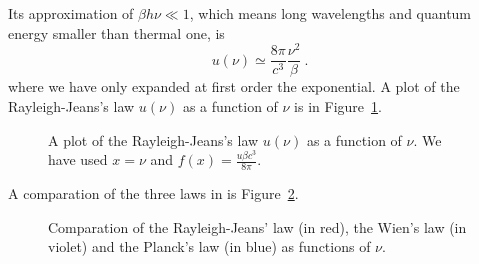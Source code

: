     Its approximation of $\beta h \nu \ll 1$, which means long wavelengths and quantum energy smaller than thermal one, is 
    \begin{equation}
        u(\nu) \simeq \frac{8 \pi}{c^3} \frac{\nu^2}{\beta} ~.
    \end{equation}
    where we have only expanded at first order the exponential. A plot of the Rayleigh-Jeans's law $u(\nu)$ as a function of $\nu$ is in Figure~\ref{br:rj}.
    \begin{figure}
        \centering
        \caption{A plot of the Rayleigh-Jeans's law $u(\nu)$ as a function of $\nu$. We have used $x = \nu$ and $f(x) = \frac{u \beta c^3}{8 \pi}$.}
        \label{br:rj}
    \end{figure}

    A comparation of the three laws in is Figure~\ref{br:3}.

    \begin{figure}
        \centering
        \caption{Comparation of the Rayleigh-Jeans' law (in red), the Wien's law (in violet) and the Planck's law (in blue) as functions of $\nu$.}
        \label{br:3}
    \end{figure}
